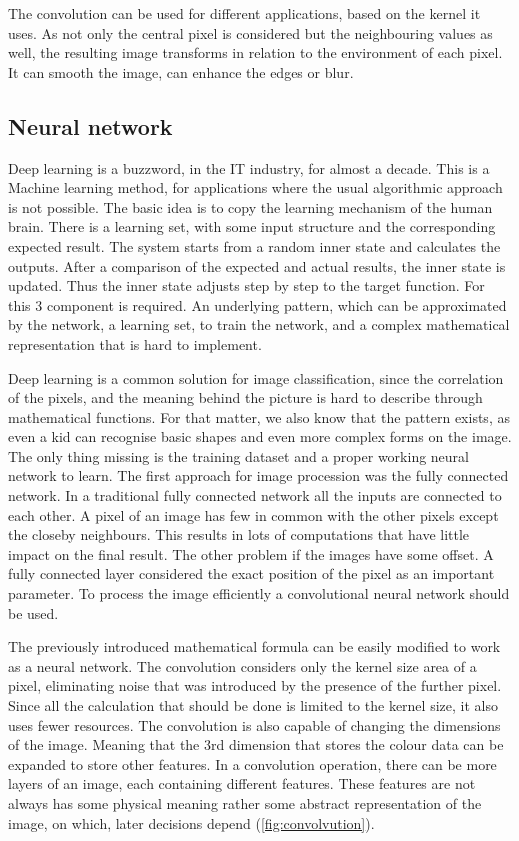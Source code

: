 The convolution can be used for different applications, based on the kernel it uses.
As not only the central pixel is considered but the neighbouring values as well, the resulting image transforms in relation to the environment of each pixel.
It can smooth the image, can enhance the edges or blur.

\subsection{Neural network} %
Deep learning is a buzzword, in the IT industry, for almost a decade.
This is a Machine learning method, for applications where the usual algorithmic approach is not possible.
The basic idea is to copy the learning mechanism of the human brain.
There is a learning set, with some input structure and the corresponding expected result.
The system starts from a random inner state and calculates the outputs.
After a comparison of the expected and actual results, the inner state is updated.
Thus the inner state adjusts step by step to the target function.
For this 3 component is required.
An underlying pattern, which can be approximated by the network, a learning set, to train the network, and a complex mathematical representation that is hard to implement.

Deep learning is a common solution for image classification, since the correlation of the pixels, and the meaning behind the picture is hard to describe through mathematical functions.
For that matter, we also know that the pattern exists, as even a kid can recognise basic shapes and even more complex forms on the image.
The only thing missing is the training dataset and a proper working neural network to learn.
The first approach for image procession was the fully connected network.
In a traditional fully connected network all the inputs are connected to each other.
A pixel of an image has few in common with the other pixels except the closeby neighbours.
This results in lots of computations that have little impact on the final result.
The other problem if the images have some offset.
A fully connected layer considered the exact position of the pixel as an important parameter.
To process the image efficiently a convolutional neural network should be used.

The previously introduced mathematical formula can be easily modified to work as a neural network.
The convolution considers only the kernel size area of a pixel, eliminating noise that was introduced by the presence of the further pixel.
Since all the calculation that should be done is limited to the kernel size, it also uses fewer resources.
The convolution is also capable of changing the dimensions of the image.
Meaning that the 3rd dimension that stores the colour data can be expanded to store other features.
In a convolution operation, there can be more layers of an image, each containing different features.
These features are not always has some physical meaning rather some abstract representation of the image, on which, later decisions depend (\cref{fig:convolvution}).

